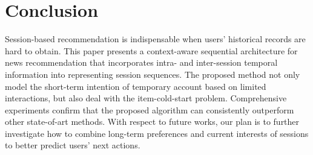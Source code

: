 \section{Conclusion}
Session-based recommendation is indispensable when users' historical records are hard to obtain. This paper presents a context-aware sequential architecture for news recommendation that incorporates intra- and inter-session temporal information into representing session sequences. The proposed method not only model the short-term intention of temporary account based on limited interactions, but also deal with the item-cold-start problem. Comprehensive experiments confirm that the proposed algorithm can consistently outperform other state-of-art methods. With respect to future works, our plan is to further investigate how to combine long-term preferences and current interests of sessions to better predict users' next actions.